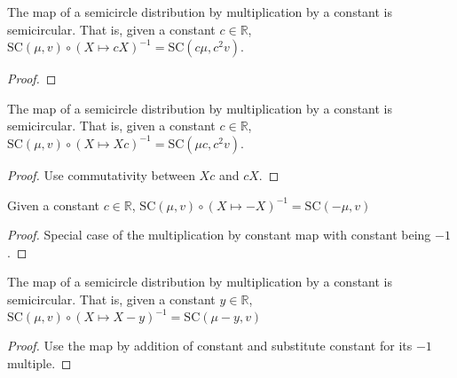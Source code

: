 \begin{lemma}\label{lem:semicircleReal_map_const_mul}
  \notready
    The map of a semicircle distribution by multiplication by a constant is semicircular. That is,
  given a constant $c \in \mathbb{R}$, $ \mathrm{SC}(\mu, v) \circ (X \mapsto cX )^{-1} = \mathrm{SC}(c\mu , c^2v)$.
  \begin{proof}
  \end{proof}
\end{lemma}



\begin{lemma}\label{lem:semicircleReal_map_mul_const}
  \mathlibok
   The map of a semicircle distribution by multiplication by a constant is semicircular. That is,
  given a constant $c \in \mathbb{R}$, $ \mathrm{SC}(\mu, v) \circ (X \mapsto Xc )^{-1} = \mathrm{SC}(\mu c , c^2v)$.
  \begin{proof}
    Use commutativity between $Xc$ and $cX$.
  \end{proof}
\end{lemma}



\begin{lemma}\label{lem:semicircleReal_map_neg}
  \mathlibok
  Given a constant $c \in \mathbb{R}$, $ \mathrm{SC}(\mu, v) \circ (X \mapsto -X )^{-1} = \mathrm{SC}(-\mu  , v)$
  \begin{proof}
     Special case of the multiplication by constant map with constant being $-1$.
  \end{proof}
\end{lemma}

\begin{lemma}\label{lem:semicircleReal_map_sub_const}
  \mathlibok
   The map of a semicircle distribution by multiplication by a constant is semicircular. That is,
  given a constant $y \in \mathbb{R}$, $ \mathrm{SC}(\mu, v) \circ (X  \mapsto X - y )^{-1} = \mathrm{SC}(\mu - y  , v)$
  \begin{proof}
   Use the map by addition of constant and substitute constant for its $-1$ multiple.
  \end{proof}
\end{lemma}


